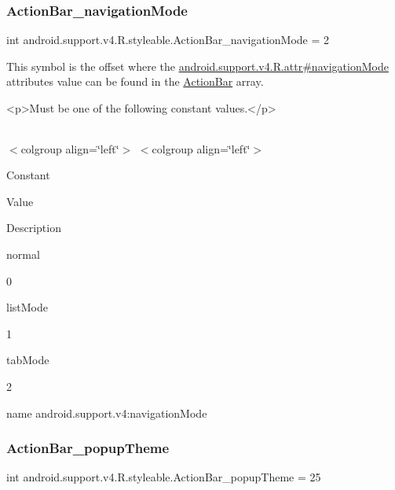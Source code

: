 \subsubsection{\texorpdfstring{Action\+Bar\+\_\+navigation\+Mode}{ActionBar\_navigationMode}}
{\footnotesize\ttfamily int android.\+support.\+v4.\+R.\+styleable.\+Action\+Bar\+\_\+navigation\+Mode = 2\hspace{0.3cm}{\ttfamily [static]}}

This symbol is the offset where the \hyperlink{classandroid_1_1support_1_1v4_1_1R_1_1attr_a1777f34b52b7f62ca810e74432643515}{android.\+support.\+v4.\+R.\+attr\#navigation\+Mode} attribute\textquotesingle{}s value can be found in the \hyperlink{classandroid_1_1support_1_1v4_1_1R_1_1styleable_adc5a3492b9c46265760d7120a04d6afa}{Action\+Bar} array.

\begin{DoxyVerb}      <p>Must be one of the following constant values.</p>
\end{DoxyVerb}
 \tabulinesep=1mm
\begin{longtabu} spread 0pt [c]{*{0}{|X[-1]}|}
\hline
\end{longtabu}
$<$colgroup align=\char`\"{}left\char`\"{}$>$ $<$colgroup align=\char`\"{}left\char`\"{}$>$ 

Constant

Value

Description 

{\ttfamily normal}

0

{\ttfamily list\+Mode}

1

{\ttfamily tab\+Mode}

2

name android.\+support.\+v4\+:navigation\+Mode \mbox{\label{classandroid_1_1support_1_1v4_1_1R_1_1styleable_af119aa9f8a6ea23d2126ea383dabfecf}} 
\subsubsection{\texorpdfstring{Action\+Bar\+\_\+popup\+Theme}{ActionBar\_popupTheme}}
{\footnotesize\ttfamily int android.\+support.\+v4.\+R.\+styleable.\+Action\+Bar\+\_\+popup\+Theme = 25\hspace{0.3cm}{\ttfamily [static]}}

